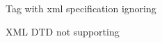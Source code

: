 
\begin{DoxyEnumerate}
\item Tag with xml specification ignoring
\item X\+ML D\+TD not supporting 
\end{DoxyEnumerate}